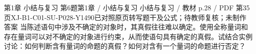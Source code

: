 \par\noindent\begin{minipage}{\linewidth}
\begin{bankitem}{第1章 小结与复习 第6题}{第1章 / 小结与复习 小结与复习 / 教材 p.28 / PDF 第35页}{XJ-B1-C01-SU-P028-Y1490}{已对照原页转写题干及公式；待教师复核；未制作答案}
当陈述语句中涉及不确定的对象时，其真假往往难以确定。使用全称量词和存在量词可以对不确定的对象进行约束，从而使语句具有确定的真假。试结合实例讨论：如何判断含有量词的命题的真假？如何对含有一个量词的命题进行否定？
\end{bankitem}
\end{minipage}\par\medskip
